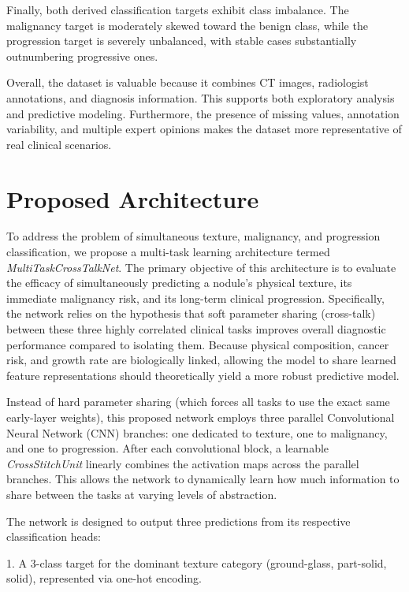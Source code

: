 Finally, both derived classification targets exhibit class imbalance. The malignancy target is moderately skewed toward the benign class, while the progression target is severely unbalanced, with stable cases substantially outnumbering progressive ones. 

Overall, the dataset is valuable because it combines CT images, radiologist annotations, and diagnosis information. This supports both exploratory analysis and predictive modeling. Furthermore, the presence of missing values, annotation variability, and multiple expert opinions makes the dataset more representative of real clinical scenarios.

\section{Proposed Architecture}
\label{section:proposedArchitecture}

To address the problem of simultaneous texture, malignancy, and progression classification, we propose a multi-task learning architecture termed \textit{MultiTaskCrossTalkNet}. The primary objective of this architecture is to evaluate the efficacy of simultaneously predicting a nodule's physical texture, its immediate malignancy risk, and its long-term clinical progression. Specifically, the network relies on the hypothesis that soft parameter sharing (cross-talk) between these three highly correlated clinical tasks improves overall diagnostic performance compared to isolating them. Because physical composition, cancer risk, and growth rate are biologically linked, allowing the model to share learned feature representations should theoretically yield a more robust predictive model.

Instead of hard parameter sharing (which forces all tasks to use the exact same early-layer weights), this proposed network employs three parallel Convolutional Neural Network (CNN) branches: one dedicated to texture, one to malignancy, and one to progression. After each convolutional block, a learnable \textit{CrossStitchUnit} linearly combines the activation maps across the parallel branches. This allows the network to dynamically learn how much information to share between the tasks at varying levels of abstraction.

The network is designed to output three predictions from its respective classification heads:

1. A 3-class target for the dominant texture category (ground-glass, part-solid, solid), represented via one-hot encoding.

